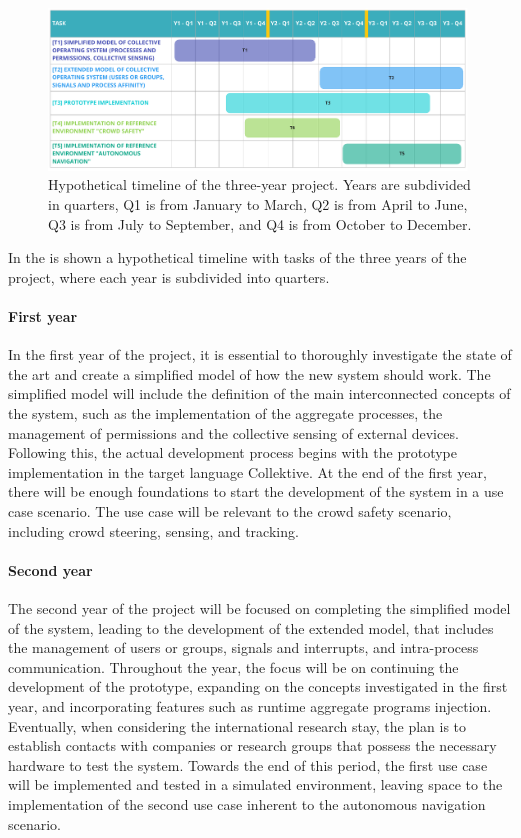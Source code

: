 \documentclass[12pt, a4paper]{article}
\begin{document}
\begin{figure}
    \centering
    \includegraphics[width=0.99\textwidth]{figures/timeline}
    \caption{Hypothetical timeline of the three-year project.
        Years are subdivided in quarters, Q1 is from January to March,
        Q2 is from April to June, Q3 is from July to September, and Q4 is from October to December.
    }\label{fig:timeline}
\end{figure}

In the  is shown a hypothetical timeline with tasks of the three years of the project,
where each year is subdivided into quarters.

\sloppypar
\paragraph{First year}
In the first year of the project,
it is essential to thoroughly investigate the state of the art and create a simplified model of how the new system should work.
%
The simplified model will include the definition of the main interconnected concepts of the system,
such as the implementation of the aggregate processes,
the management of permissions and the collective sensing of external devices.
%
Following this,
the actual development process begins with the prototype implementation in the target language Collektive.
%
At the end of the first year,
there will be enough foundations to start the development of the system in a use case scenario.
%
The use case will be relevant to the crowd safety scenario,
including crowd steering, sensing, and tracking.

\sloppypar
\paragraph{Second year}
The second year of the project will be focused on completing the simplified model of the system,
leading to the development of the extended model,
that includes the management of users or groups, signals and interrupts, and intra-process communication.
%
Throughout the year,
the focus will be on continuing the development of the prototype,
expanding on the concepts investigated in the first year,
and incorporating features such as runtime aggregate programs injection.
%
Eventually,
when considering the international research stay,
the plan is to establish contacts with companies or research groups that possess the necessary hardware to test the system.
%
Towards the end of this period,
the first use case will be implemented and tested in a simulated environment,
leaving space to the implementation of the second use case inherent to the autonomous navigation scenario.
\end{document}
